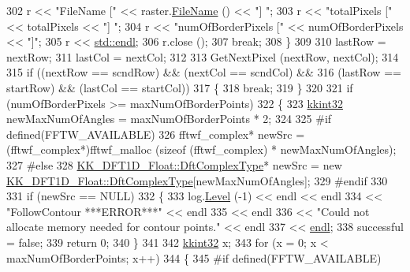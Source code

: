 \begin{DoxyCode}
302       r << \textcolor{stringliteral}{"FileName  ["} << raster.\hyperlink{class_k_k_b_1_1_raster_a847b09bd1487b61bf126d7732f3694f2}{FileName} ()        << \textcolor{stringliteral}{"]  "};  
303       r << \textcolor{stringliteral}{"totalPixels ["} << totalPixels             << \textcolor{stringliteral}{"]  "};
304       r << \textcolor{stringliteral}{"numOfBorderPixels ["} << numOfBorderPixels << \textcolor{stringliteral}{"]"};
305       r << \hyperlink{namespace_k_k_b_ad1f50f65af6adc8fa9e6f62d007818a8}{std::endl};
306       r.close ();
307       \textcolor{keywordflow}{break};
308     \}
309 
310     lastRow = nextRow;
311     lastCol = nextCol;
312 
313     GetNextPixel (nextRow, nextCol);
314 
315     \textcolor{keywordflow}{if}  ((nextRow == scndRow)   &&  (nextCol == scndCol)  &&
316          (lastRow == startRow)  &&  (lastCol == startCol))
317     \{
318       \textcolor{keywordflow}{break};
319     \}
320 
321     \textcolor{keywordflow}{if}  (numOfBorderPixels >= maxNumOfBorderPoints)
322     \{
323       \hyperlink{namespace_k_k_b_a8fa4952cc84fda1de4bec1fbdd8d5b1b}{kkint32}  newMaxNumOfAngles = maxNumOfBorderPoints * 2;
324 
325 \textcolor{preprocessor}{      #if  defined(FFTW\_AVAILABLE)}
326         fftwf\_complex*  newSrc = (fftwf\_complex*)fftwf\_malloc (\textcolor{keyword}{sizeof} (fftwf\_complex) * newMaxNumOfAngles);
327 \textcolor{preprocessor}{      #else}
328         \hyperlink{class_k_k_b_1_1_k_k___d_f_t1_d_a4cbc827157dd30ddec2d3753e552a827}{KK\_DFT1D\_Float::DftComplexType}*  newSrc = \textcolor{keyword}{new} 
      \hyperlink{class_k_k_b_1_1_k_k___d_f_t1_d_a4cbc827157dd30ddec2d3753e552a827}{KK\_DFT1D\_Float::DftComplexType}[newMaxNumOfAngles];
329 \textcolor{preprocessor}{      #endif}
330 
331       \textcolor{keywordflow}{if}  (newSrc == NULL)
332       \{
333         log.\hyperlink{class_k_k_b_1_1_run_log_a32cf761d7f2e747465fd80533fdbb659}{Level} (-1) << endl << endl
334                        << \textcolor{stringliteral}{"FollowContour     ***ERROR***"} << endl
335                        << endl
336                        << \textcolor{stringliteral}{"Could not allocate memory needed for contour points."} << endl
337                        << \hyperlink{namespace_k_k_b_ad1f50f65af6adc8fa9e6f62d007818a8}{endl};
338         successful = \textcolor{keyword}{false};
339         \textcolor{keywordflow}{return} 0;
340       \}
341 
342       \hyperlink{namespace_k_k_b_a8fa4952cc84fda1de4bec1fbdd8d5b1b}{kkint32}  x;
343       \textcolor{keywordflow}{for}  (x = 0; x < maxNumOfBorderPoints; x++)
344       \{
345 \textcolor{preprocessor}{        #if  defined(FFTW\_AVAILABLE)}

\end{DoxyCode}
